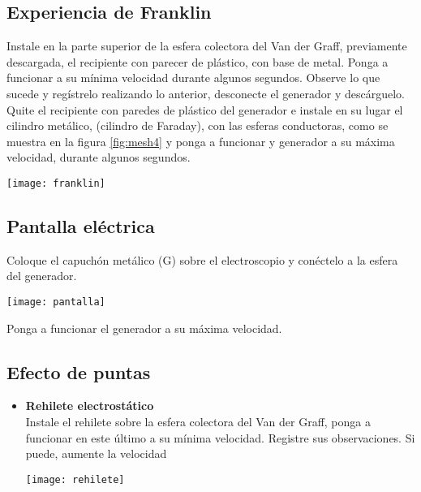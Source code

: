 \documentclass[11pt]{article}
\newenvironment{Figuras}
  {\par\medskip\noindent\minipage{\linewidth}}
  {\endminipage\par\medskip}
\begin{document}
\begin{multicols}{2}
	\subsection{Experiencia de Franklin}
		Instale en la parte superior de la esfera colectora del Van der Graff, previamente descargada, el recipiente con parecer de plástico, con base de metal. Ponga a funcionar a su mínima velocidad durante algunos segundos. Observe lo que sucede y regístrelo realizando lo anterior, desconecte el generador y descárguelo. Quite el recipiente con paredes de plástico del generador e instale en su lugar el cilindro metálico, (cilindro de Faraday), con las esferas conductoras, como se muestra en la figura \ref{fig:mesh4} y ponga a funcionar y generador a su máxima velocidad, durante algunos segundos.

\begin{Figuras}
	\centering
    \texttt{[image: franklin]}
    \label{fig:mesh4}
\end{Figuras}

	\subsection{Pantalla eléctrica}
		Coloque el capuchón metálico (G) sobre el electroscopio y conéctelo a la esfera del generador.
\begin{Figuras}
	\centering
    \texttt{[image: pantalla]}
    \label{fig:mesh5}
\end{Figuras}

Ponga a funcionar el generador a su máxima velocidad. 

	\subsection{Efecto de puntas}
		\begin{itemize}

		\item\textbf{Rehilete electrostático}\\
			Instale el rehilete sobre la esfera colectora del Van der Graff, ponga a funcionar en este último a su mínima velocidad. Registre sus observaciones. Si puede, aumente la velocidad

		\begin{Figuras}
			\centering
  			  \texttt{[image: rehilete]}
			    \label{fig:mesh6}
		\end{Figuras}


\end{itemize}
\end{multicols}
\end{document}
